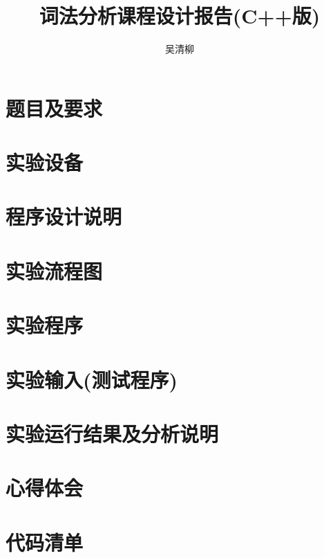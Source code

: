 \documentclass[12pt]{article}
\title{词法分析课程设计报告(C++版)}
\author{\textup{吴清柳}}
\begin{document}

\tableofcontents
\newpage

\section{题目及要求}

\section{实验设备}

\section{程序设计说明}

\section{实验流程图}

\section{实验程序}

\section{实验输入(测试程序)}

\section{实验运行结果及分析说明}

\section{心得体会}
\section{代码清单}

% 
% 
\end{document}
